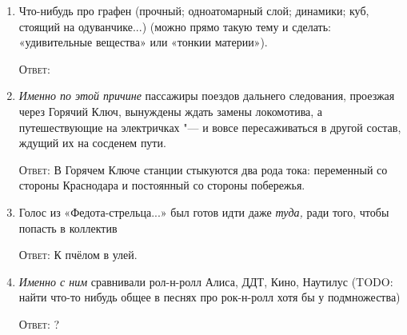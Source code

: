 \documentclass[a4paper,10pt]{article}
\let\keyword\textsc
\newenvironment{topic}{\begin{enumerate}}{\end{enumerate}}
\newcommand{\question}[3]{\item[#1.] #2 \par \keyword{Ответ:} #3}
\begin{document}
\begin{topic}
 \question{??}{Что-нибудь про графен (прочный; одноатомарный слой; динамики; куб, стоящий на одуванчике...) (можно прямо такую тему и сделать: «удивительные вещества» или «тонкии материи»).}
 \question{40--50}{\emph{Именно по этой причине} пассажиры поездов дальнего следования, проезжая через Горячий Ключ, вынуждены ждать замены локомотива, а путешествующие на электричках "--- и вовсе пересаживаться в другой состав, ждущий их на сосденем пути.}{В Горячем Ключе станции стыкуются два рода тока: переменный со стороны Краснодара и постоянный со стороны побережья.}
 \question{??}{Голос из «Федота-стрельца...» был готов идти даже \emph{туда,} ради того, чтобы попасть в коллектив}{К пчёлом в улей.}
 \question{??}{\emph{Именно с ним} сравнивали рол-н-ролл Алиса, ДДТ, Кино, Наутилус (TODO: найти что-то нибудь общее в песнях про рок-н-ролл хотя бы у подмножества)}{?}
\end{topic}
\end{document}
